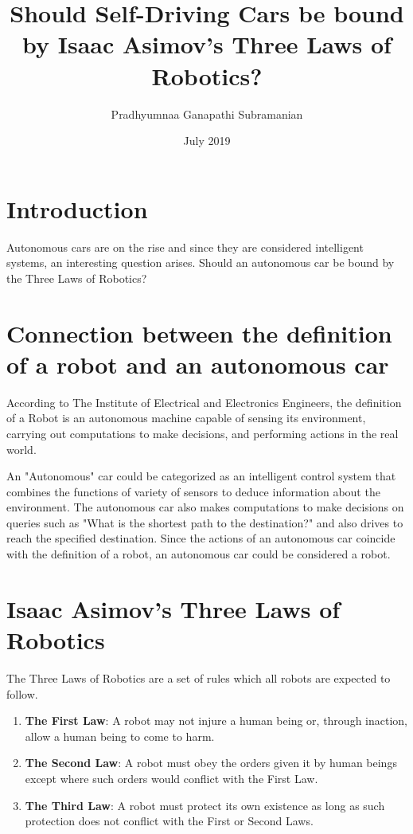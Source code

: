 \documentclass{article}
\title{Should Self-Driving Cars be bound by Isaac Asimov's Three Laws of Robotics?}
\author{Pradhyumnaa Ganapathi Subramanian}
\date{July 2019}
\begin{document}
\maketitle

\section{Introduction}
Autonomous cars are on the rise and since they are considered intelligent systems, an interesting question arises. Should an autonomous car be bound by the Three Laws of Robotics?

\section{Connection between the definition of a robot and an autonomous car}
According to The Institute of Electrical and Electronics Engineers, the definition of a Robot is an autonomous machine capable of sensing its environment, carrying out computations to make decisions, and performing actions in the real world.

An "Autonomous" car could be categorized as an intelligent control system that combines the functions of variety of sensors to deduce information about the environment. The autonomous car also makes computations to make decisions on queries such as "What is the shortest path to the destination?" and also drives to reach the specified destination. Since the actions of an autonomous car coincide with the definition of a robot, an autonomous car could be considered a robot.
\section{Isaac Asimov's Three Laws of Robotics}
The Three Laws of Robotics are a set of rules which all robots are expected to follow.

\begin{enumerate}
\item \textbf{The First Law}: A robot may not injure a human being or, through inaction, allow a human being to come to harm.
\item \textbf{The Second Law}: A robot must obey the orders given it by human beings except   where such orders would conflict with the First Law.
\item \textbf{The Third Law}: A robot must protect its own existence as long as such protection does not conflict with the First or Second Laws. 
\end{enumerate}
\end{document}
